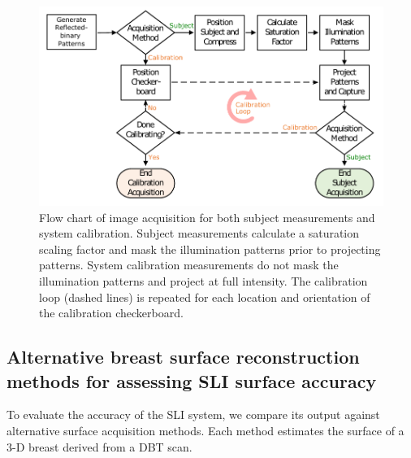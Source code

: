 \begin{figure}
    \begin{center}
    \includegraphics[width=.9\textwidth]{fig/omci/sli_flowchart.pdf}
    \end{center}
    \caption{Flow chart of image acquisition for both subject measurements and system calibration. Subject measurements calculate a saturation scaling factor and mask the illumination patterns prior to projecting patterns. System calibration measurements do not mask the illumination patterns and project at full intensity. The calibration loop (dashed lines) is repeated for each location and orientation of the calibration checkerboard.} 
    \label{fig:sli_flowchart}
\end{figure} 


\subsection{Alternative breast surface reconstruction methods for assessing SLI surface accuracy}
To evaluate the accuracy of the SLI system, we compare its output against alternative surface acquisition methods. Each method estimates the surface of a 3-D breast derived from a DBT scan.

